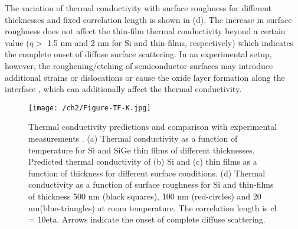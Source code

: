 \par The variation of thermal conductivity with surface roughness for different thicknesses and fixed correlation length is shown in (d). The increase in surface roughness does not affect the thin-film thermal conductivity beyond a certain value ($\eta>$ 1.5 nm and 2 nm for Si and  thin-films, respectively) which indicates the complete onset of diffuse surface scattering. In an experimental setup, however, the roughening/etching of semiconductor surfaces may introduce additional strains or dislocations \cite{RN67} or cause the oxide layer formation along the interface \cite{RN393}, which can additionally affect the thermal conductivity.
\begin{figure}[hbt]
	\texttt{[image: /ch2/Figure-TF-K.jpg]}
	\caption{Thermal conductivity predictions and comparison with experimental measurements \cite{RN274,RN189,RN127,RN126,RN217,RN128,RN124,RN227,RN125}. (a) Thermal conductivity as a function of temperature for Si and SiGe thin films of different thicknesses. Predicted thermal conductivity of (b) Si and (c)  thin films as a function of thickness for different surface conditions. (d) Thermal conductivity as a function of surface roughness for Si and  thin-films of thickness 500 nm (black squares), 100 nm (red-circles) and 20 nm(blue-triangles) at room temperature. The correlation length is \gls{cl} = 10\gls{eta}. Arrows indicate the onset of complete diffuse scattering.}
	\label{fig:ch2-tf-K}
\end{figure}
\newpage
